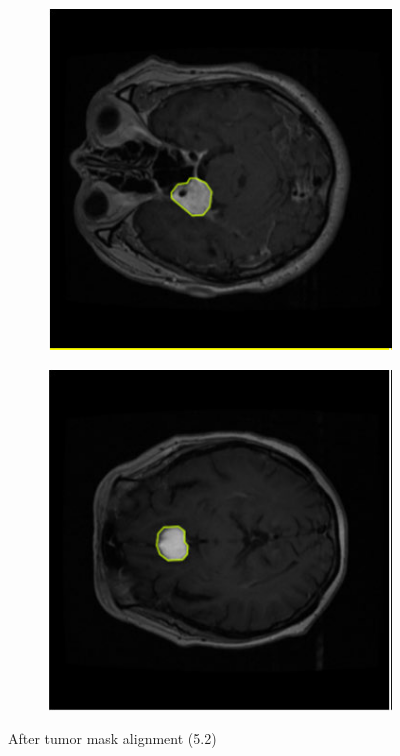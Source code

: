 \documentclass[a4paper,12pt]{extarticle}
\begin{document}
\begin{figure}[H]
\begin{subfigure}[b]{0.2\textwidth}
    \end{subfigure}
    \begin{subfigure}[b]{0.2\textwidth}
        \centering
        \includegraphics[width=\textwidth]{figure/7.png}
    \end{subfigure}
    \begin{subfigure}[b]{0.2\textwidth}
        \centering
        \includegraphics[width=\textwidth]{figure/8.png}
    \end{subfigure}
    \caption{After tumor mask alignment (5.2)}
    \label{fig:second_row}
\end{figure}
\end{document}
